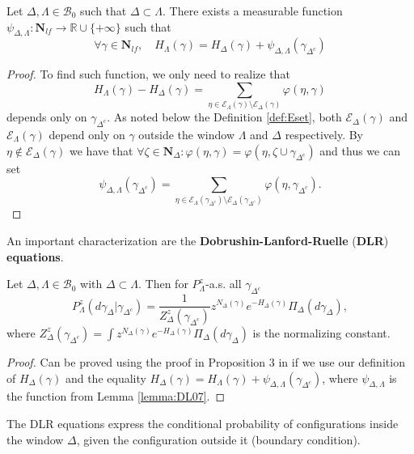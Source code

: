 \begin{lemma}\label{lemma:DL07}
	Let $\Delta,\Lambda \in \mathcal B_0$ such that $\Delta \subset \Lambda$. There exists a measurable function $\psi_{\Delta,\Lambda}:\mathbf N_{lf}\to \mathbb R\cup\{+\infty\}$ such that
	$$\forall \gamma \in \mathbf N_{lf},\quad H_\Lambda(\gamma) = H_\Delta(\gamma) + \psi_{\Delta,\Lambda}(\gamma_{\Delta^c})$$
\end{lemma}
\begin{proof}
	To find such function, we only need to realize that
	$$H_\Lambda(\gamma) - H_\Delta(\gamma) = \sum_{\eta \in \mathcal E_\Lambda(\gamma) \setminus \mathcal E_\Delta(\gamma)} \varphi(\eta,\gamma)$$
	depends only on $\gamma_{\Delta^c}$. As noted below the Definition \ref{def:Eset}, both $\mathcal E_\Delta(\gamma)$ and $\mathcal E_\Lambda(\gamma)$ depend only on $\gamma$ outside the window $\Lambda$ and $\Delta$ respectively. By $\eta \notin \mathcal E_{\Delta}(\gamma)$ we have that $\forall \zeta \in \mathbf N_\Delta: \varphi(\eta,\gamma)=\varphi(\eta,\zeta \cup \gamma_{\Delta^c})$ and thus we can set
	$$\psi_{\Delta,\Lambda}(\gamma_{\Delta^c}) = \sum_{\eta \in \mathcal E_\Lambda(\gamma_{\Delta^c}) \setminus \mathcal E_\Delta(\gamma_{\Delta^c})} \varphi(\eta,\gamma_{\Delta^c}).$$
\end{proof}

An important characterization are the \textbf{Dobrushin-Lanford-Ruelle} (\textbf{DLR}) \textbf{equations}.

\begin{proposition}
	Let $\Delta,\Lambda\in \mathcal B_0$ with $\Delta \subset \Lambda$. Then for $P^z_{\Lambda}$-a.s. all $\gamma_{\Delta^c}$
	$$P^z_{\Lambda}(d\gamma_\Delta|\gamma_{\Delta^c}) = \frac 1{Z^z_\Delta(\gamma_{\Delta^c})} z^{N_\Delta(\gamma)} e^{-H_\Delta(\gamma)} \Pi_\Delta (d\gamma_\Delta),$$
		where $Z^z_{\Delta}(\gamma_{\Delta^c}) = \int z^{N_\Delta(\gamma)} e^{-H_\Delta(\gamma)} \Pi_\Delta(d\gamma_\Delta)$ is the normalizing constant. 
\end{proposition}
\begin{proof}
	Can be proved using the proof in Proposition $3$ in \cite{Dereudre2017} if we use our definition of $H_\Delta(\gamma)$ and the equality $H_\Delta(\gamma) = H_\Lambda(\gamma) + \psi_{\Delta,\Lambda}(\gamma_{\Delta^c})$, where 
	$\psi_{\Delta,\Lambda}$ is the function from Lemma \ref{lemma:DL07}.
\end{proof}

The DLR equations express the conditional probability of configurations inside the window $\Delta$, given the configuration outside it (boundary condition).

